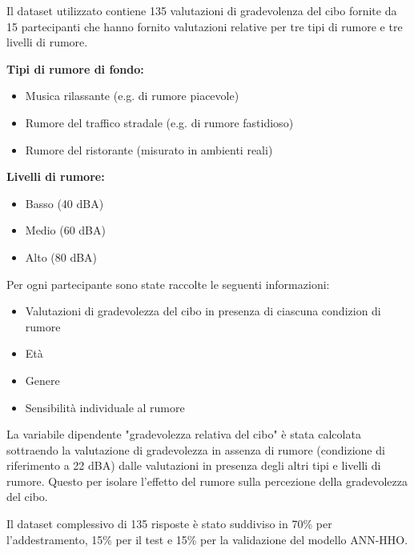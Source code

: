 Il dataset utilizzato contiene 135 valutazioni di gradevolenza del cibo fornite da 15 partecipanti che hanno fornito valutazioni relative per tre tipi di rumore e tre livelli di rumore. \cite{Bellmann2019}

\textbf{Tipi di rumore di fondo:}
\begin{itemize}
      \item Musica rilassante (e.g. di rumore piacevole)
      \item Rumore del traffico stradale (e.g. di rumore fastidioso)
      \item Rumore del ristorante (misurato in ambienti reali)
\end{itemize}

\textbf{Livelli di rumore:}
\begin{itemize}
      \item Basso (40 dBA)
      \item Medio (60 dBA)
      \item Alto (80 dBA)
\end{itemize}

Per ogni partecipante sono state raccolte le seguenti informazioni:

\begin{itemize}
      \item Valutazioni di gradevolezza del cibo in presenza di ciascuna condizion di rumore
      \item Età
      \item Genere
      \item Sensibilità individuale al rumore
\end{itemize}

La variabile dipendente "gradevolezza relativa del cibo" è stata calcolata sottraendo la valutazione di gradevolezza in assenza di rumore (condizione di riferimento a 22 dBA) dalle valutazioni in presenza degli altri tipi e livelli di rumore. Questo per isolare l'effetto del rumore sulla percezione della gradevolezza del cibo.

Il dataset complessivo di 135 risposte è stato suddiviso in 70\% per l'addestramento, 15\% per il test e 15\% per la validazione del modello ANN-HHO.

